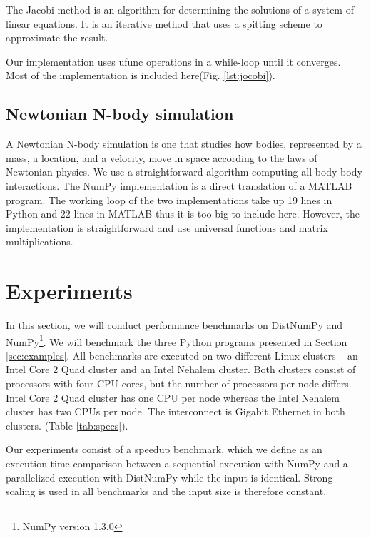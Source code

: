 \documentclass{sigplanconf}
\begin{document}
The Jacobi method is an algorithm for determining the solutions of a system of linear equations. It is an iterative method that uses a spitting scheme to approximate the result.

Our implementation uses ufunc operations in a while-loop until it converges. Most of the implementation is included here(Fig. \ref{lst:jocobi}).


\subsection{Newtonian N-body simulation}
A Newtonian N-body simulation is one that studies how bodies, represented by a mass, a location, and a velocity, move in space according to the laws of Newtonian physics. We use a straightforward algorithm computing all body-body interactions. The NumPy implementation is a direct translation of a MATLAB program\cite{assignmentNbody}. The working loop of the two implementations take up 19 lines in Python and 22 lines in MATLAB thus it is too big to include here. However, the implementation is straightforward and use universal functions and matrix multiplications.


\section{Experiments}
In this section, we will conduct performance benchmarks on DistNumPy and NumPy\footnote{NumPy version 1.3.0}. We will benchmark the three Python programs presented in Section \ref{sec:examples}. All benchmarks are executed on two different Linux clusters -- an Intel Core 2 Quad cluster and an Intel Nehalem cluster. Both clusters consist of processors with four CPU-cores, but the number of processors per node differs. Intel Core 2 Quad cluster has one CPU per node whereas the Intel Nehalem cluster has two CPUs per node. The interconnect is Gigabit Ethernet in both clusters. (Table \ref{tab:specs}).

Our experiments consist of a speedup benchmark, which we define as an execution time comparison between a sequential execution with NumPy and a parallelized execution with DistNumPy while the input is identical. Strong-scaling is used in all benchmarks and the input size is therefore constant.


\end{document}
